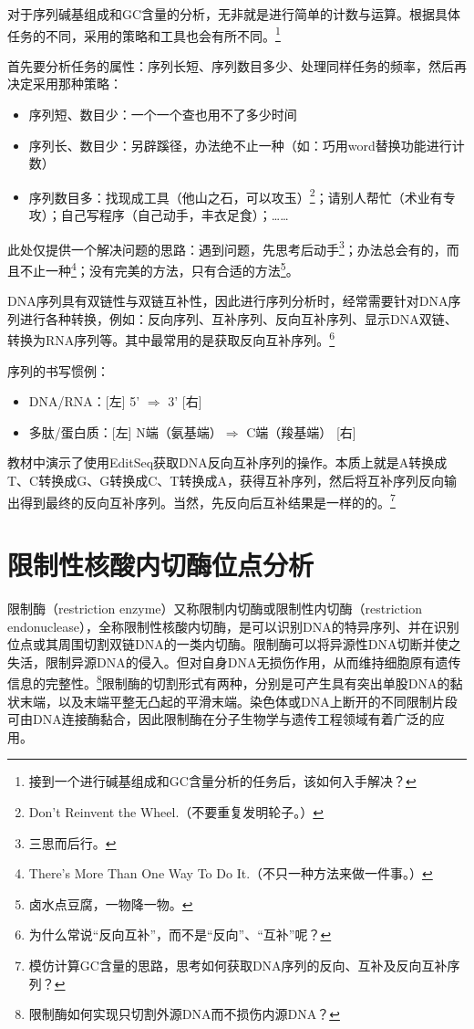 \documentclass[11pt,a4paper,twoside]{book}
\begin{document}
对于序列碱基组成和GC含量的分析，无非就是进行简单的计数与运算。根据具体任务的不同，采用的策略和工具也会有所不同。\footnote{接到一个进行碱基组成和GC含量分析的任务后，该如何入手解决？}

首先要分析任务的属性：序列长短、序列数目多少、处理同样任务的频率，然后再决定采用那种策略：
\begin{itemize}
  \item 序列短、数目少：一个一个查也用不了多少时间
  \item 序列长、数目少：另辟蹊径，办法绝不止一种（如：巧用word替换功能进行计数）
  \item 序列数目多：找现成工具（他山之石，可以攻玉）\footnote{Don't Reinvent the Wheel.（不要重复发明轮子。）}；请别人帮忙（术业有专攻）；自己写程序（自己动手，丰衣足食）；……
\end{itemize}

此处仅提供一个解决问题的思路：遇到问题，先思考后动手\footnote{三思而后行。}；办法总会有的，而且不止一种\footnote{There's More Than One Way To Do It.（不只一种方法来做一件事。）}；没有完美的方法，只有合适的方法\footnote{卤水点豆腐，一物降一物。}。

DNA序列具有双链性与双链互补性，因此进行序列分析时，经常需要针对DNA序列进行各种转换，例如：反向序列、互补序列、反向互补序列、显示DNA双链、转换为RNA序列等。其中最常用的是获取反向互补序列。\footnote{为什么常说“反向互补”，而不是“反向”、“互补”呢？}

序列的书写惯例：
\begin{itemize}
  \item DNA/RNA：[左] 5' $\Longrightarrow$ 3' [右]
  \item 多肽/蛋白质：[左] N端（氨基端）$\Longrightarrow$ C端（羧基端） [右]
\end{itemize}

教材中演示了使用EditSeq获取DNA反向互补序列的操作。本质上就是A转换成T、C转换成G、G转换成C、T转换成A，获得互补序列，然后将互补序列反向输出得到最终的反向互补序列。当然，先反向后互补结果是一样的的。\footnote{模仿计算GC含量的思路，思考如何获取DNA序列的反向、互补及反向互补序列？}

\section{限制性核酸内切酶位点分析}
限制酶（restriction enzyme）又称限制内切酶或限制性内切酶（restriction endonuclease），全称限制性核酸内切酶，是可以识别DNA的特异序列、并在识别位点或其周围切割双链DNA的一类内切酶。限制酶可以将异源性DNA切断并使之失活，限制异源DNA的侵入。但对自身DNA无损伤作用，从而维持细胞原有遗传信息的完整性。\footnote{限制酶如何实现只切割外源DNA而不损伤内源DNA？}限制酶的切割形式有两种，分别是可产生具有突出单股DNA的黏状末端，以及末端平整无凸起的平滑末端。染色体或DNA上断开的不同限制片段可由DNA连接酶黏合，因此限制酶在分子生物学与遗传工程领域有着广泛的应用。
\end{document}
